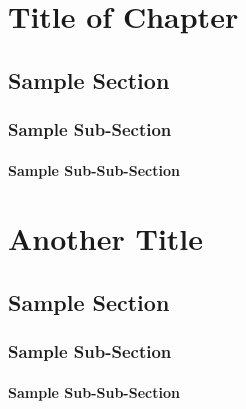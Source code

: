 \documentclass{report}
\begin{document}
	\chapter{Title of Chapter}
	\section{Sample Section}
	\subsection{Sample Sub-Section}
	\subsubsection{Sample Sub-Sub-Section}
	
	\chapter*{Another Title}
	\section*{Sample Section}
	\subsection*{Sample Sub-Section}
	\subsubsection*{Sample Sub-Sub-Section}
\end{document}
